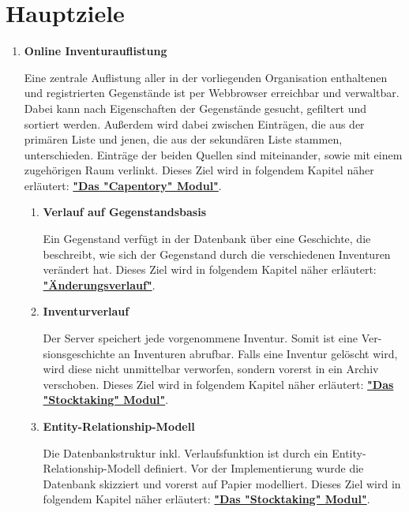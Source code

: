 \documentclass[
    headings=optiontotocandhead,%
    twoside,
    numbers=noenddot,%
    toc=flat, %
    12pt, %
    titlepage, %
    parskip=full, %
    listof=totoc, %
    listof=flat, %
    numbers=noenddot, %
    bibliography=totoc, %
    a4paper,DIV=14,
    BCOR=15mm,
]{scrbook}
\begin{document}
\section{Hauptziele}

\begin{enumerate}


\item \textbf{Online Inventurauflistung}

Eine zentrale Auflistung aller in der vorliegenden Organisation enthaltenen und registrierten Gegenstände ist per Webbrowser erreichbar und verwaltbar. Dabei kann nach Eigenschaften der Gegenstände gesucht, gefiltert und sortiert werden. Außerdem wird dabei zwischen Einträgen, die aus der primären Liste und jenen, die aus der sekundären Liste stammen, unterschieden. Einträge der beiden Quellen sind miteinander, sowie mit einem zugehörigen Raum verlinkt. 
Dieses Ziel wird in folgendem Kapitel näher erläutert: \textbf{\href{das-capentory-modul}{"Das "Capentory" Modul"}}.

\begin{enumerate}
  \item	\textbf{Verlauf auf Gegenstandsbasis}

  Ein Gegenstand verfügt in der Datenbank über eine Geschichte, die beschreibt, wie sich der Gegenstand durch die verschiedenen Inventuren verändert hat.
  Dieses Ziel wird in folgendem Kapitel näher erläutert: \textbf{\href{uxe4nderungsverlauf}{"Änderungsverlauf"}}.

  \item	\textbf{Inventurverlauf}

  Der Server speichert jede vorgenommene Inventur. Somit ist eine Ver-sionsgeschichte an Inventuren abrufbar. Falls eine Inventur gelöscht wird, wird diese nicht unmittelbar verworfen, sondern vorerst in ein Archiv verschoben.
  Dieses Ziel wird in folgendem Kapitel näher erläutert: \textbf{\href{das-stocktaking-modul}{"Das "Stocktaking" Modul"}}.
  
  \item	\textbf{Entity-Relationship-Modell}

  Die Datenbankstruktur inkl. Verlaufsfunktion ist durch ein Entity-Relationship-Modell definiert. Vor der Implementierung wurde die Datenbank skizziert und vorerst auf Papier modelliert. 
  Dieses Ziel wird in folgendem Kapitel näher erläutert: \textbf{\href{das-stocktaking-modul}{"Das "Stocktaking" Modul"}}.
\end{enumerate}




\end{enumerate}
\end{document}

